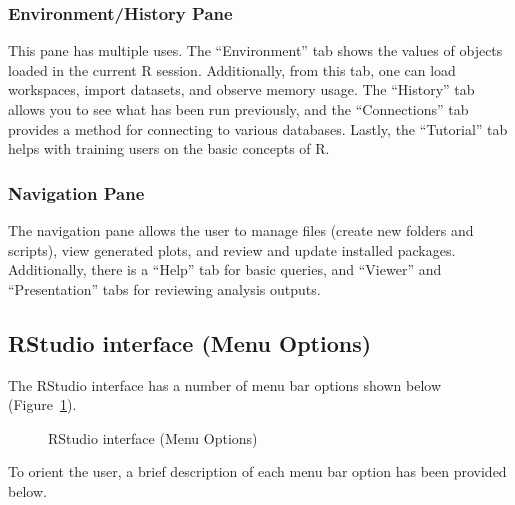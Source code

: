 \documentclass[
  letterpaper,
  DIV=11,
  numbers=noendperiod]{scrreprt}
\begin{document}
\subsubsection{Environment/History Pane}\label{environmenthistory-pane}

This pane has multiple uses. The ``Environment'' tab shows the values of
objects loaded in the current R session. Additionally, from this tab,
one can load workspaces, import datasets, and observe memory usage. The
``History'' tab allows you to see what has been run previously, and the
``Connections'' tab provides a method for connecting to various
databases. Lastly, the ``Tutorial'' tab helps with training users on the
basic concepts of R.

\subsubsection{Navigation Pane}\label{navigation-pane}

The navigation pane allows the user to manage files (create new folders
and scripts), view generated plots, and review and update installed
packages. Additionally, there is a ``Help'' tab for basic queries, and
``Viewer'' and ``Presentation'' tabs for reviewing analysis outputs.

\subsection{RStudio interface (Menu
Options)}\label{rstudio-interface-menu-options}

The RStudio interface has a number of menu bar options shown below
(Figure~\ref{fig-rstudio-menu-options-1}).

\begin{figure}


\caption{\label{fig-rstudio-menu-options-1}RStudio interface (Menu
Options)}

\end{figure}%

To orient the user, a brief description of each menu bar option has been
provided below.
\end{document}

